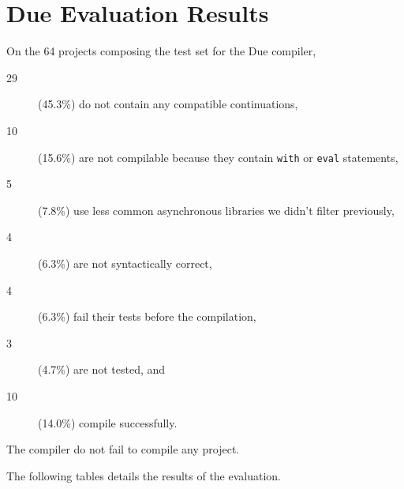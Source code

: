 \renewcommand{\glyph}{\iconfont{\XeTeXglyph633}}
\chapter{Due Evaluation Results} \label{section:results}
\eject

On the 64 projects composing the test set for the Due compiler, 
\begin{description}
\item[29] (45.3\%) do not contain any compatible continuations,
\item[10] (15.6\%) are not compilable because they contain \texttt{with} or \texttt{eval} statements,
\item[5] (7.8\%) use less common asynchronous libraries we didn't filter previously,
\item[4] (6.3\%) are not syntactically correct,
\item[4] (6.3\%) fail their tests before the compilation,
\item[3] (4.7\%) are not tested, and
\item[10] (14.0\%) compile successfully.
\end{description}
The compiler do not fail to compile any project.


The following tables details the results of the evaluation.

